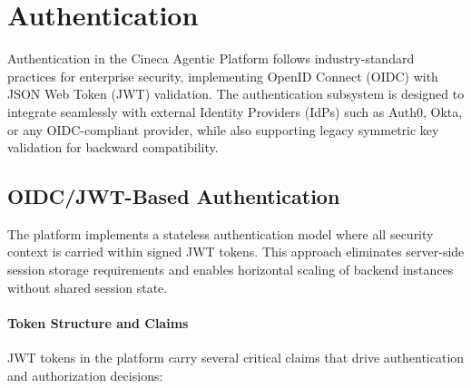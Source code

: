 
\section{Authentication}
\label{sec:authentication}

Authentication in the Cineca Agentic Platform follows industry-standard practices for enterprise security, implementing OpenID Connect (OIDC) with JSON Web Token (JWT) validation. The authentication subsystem is designed to integrate seamlessly with external Identity Providers (IdPs) such as Auth0, Okta, or any OIDC-compliant provider, while also supporting legacy symmetric key validation for backward compatibility.

\subsection{OIDC/JWT-Based Authentication}
\label{subsec:oidc-jwt}

The platform implements a stateless authentication model where all security context is carried within signed JWT tokens. This approach eliminates server-side session storage requirements and enables horizontal scaling of backend instances without shared session state.

\paragraph{Token Structure and Claims}
JWT tokens in the platform carry several critical claims that drive authentication and authorization decisions:

